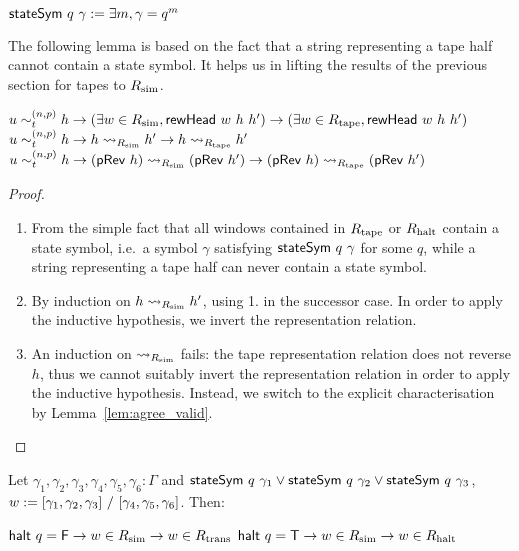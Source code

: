 \begin{definition}
  $\textsf{stateSym}~q~\gamma := \exists m, \gamma = q^m$
\end{definition}

The following lemma is based on the fact that a string representing a tape half cannot contain a state symbol. It helps us in lifting the results of the previous section for tapes to $R_{\text{sim}}$.
\begin{lemma}\label{lem:sim_inv1}\leavevmode
  \begin{enumerate}
     $u \sim_t^{(n, p)} h \rightarrow (\exists w \in R_{\text{sim}}, \textsf{rewHead}~w~h~h') \rightarrow (\exists w \in R_{\text{tape}}, \textsf{rewHead}~w~h~h')$
     $u \sim_t^{(n, p)} h \rightarrow h \rightsquigarrow_{R_{\text{sim}}} h' \rightarrow h \rightsquigarrow_{R_{\text{tape}}} h'$
     $u \sim_t^{(n, p)} h \rightarrow (\textsf{pRev}~{h}) \rightsquigarrow_{R_{\text{sim}}} (\textsf{pRev}~{h'}) \rightarrow (\textsf{pRev}~{h}) \rightsquigarrow_{R_{\text{tape}}} (\textsf{pRev}~{h'})$
  \end{enumerate}
\end{lemma}
\begin{proof}
  \begin{enumerate}
    \item From the simple fact that all windows contained in $R_{\text{tape}}$ or $R_{\text{halt}}$ contain a state symbol, i.e.\ a symbol $\gamma$ satisfying $\textsf{stateSym}~q~\gamma$ for some $q$, while a string representing a tape half can never contain a state symbol.
    \item By induction on $h \rightsquigarrow_{R_{\text{sim}}} h'$, using 1. in the successor case. In order to apply the inductive hypothesis, we invert the representation relation.
    \item An induction on $\rightsquigarrow_{R_{\text{sim}}}$ fails: the tape representation relation does not reverse $h$, thus we cannot suitably invert the representation relation in order to apply the inductive hypothesis. Instead, we switch to the explicit characterisation by Lemma~\ref{lem:agree_valid}.
  \end{enumerate}
\end{proof}


\begin{lemma}\label{lem:sim_inv2}\leavevmode
  Let $\gamma_1, \gamma_2, \gamma_3, \gamma_4, \gamma_5, \gamma_6 : \Gamma$ and $\textsf{stateSym}~q~\gamma_1 \lor \textsf{stateSym}~q~\gamma_2 \lor \textsf{stateSym}~q~\gamma_3$, $w := [\gamma_1, \gamma_2, \gamma_3]~/~[\gamma_4, \gamma_5, \gamma_6]$. 
  Then:
  \begin{enumerate}
     $\textsf{halt}~q = \mathsf{F} \rightarrow w \in R_{\text{sim}} \rightarrow w \in R_{\text{trans}}$
     $\textsf{halt}~q = \mathsf{T} \rightarrow  w \in R_{\text{sim}} \rightarrow w \in R_{\text{halt}}$
  \end{enumerate}
\end{lemma}

